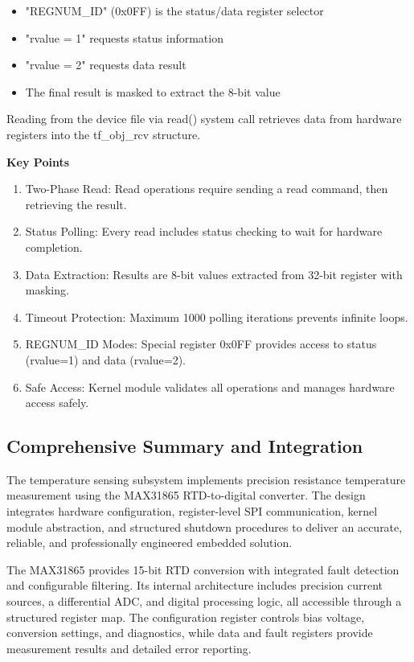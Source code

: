 \begin{itemize}
\item "REGNUM\_ID" (0x0FF) is the status/data register selector
\item "rvalue = 1" requests status information
\item "rvalue = 2" requests data result
\item The final result is masked to extract the 8-bit value
\end{itemize}

Reading from the device file via read() system call retrieves data from hardware registers into the tf\_obj\_rcv structure.

\textbf{Key Points}
\begin{enumerate}
\item Two-Phase Read: Read operations require sending a read command, then retrieving the result.
\item Status Polling: Every read includes status checking to wait for hardware completion.
\item Data Extraction: Results are 8-bit values extracted from 32-bit register with masking.
\item Timeout Protection: Maximum 1000 polling iterations prevents infinite loops.
\item REGNUM\_ID Modes: Special register 0x0FF provides access to status (rvalue=1) and data (rvalue=2).
\item Safe Access: Kernel module validates all operations and manages hardware access safely.
\end{enumerate}

\subsection{Comprehensive Summary and Integration}
The temperature sensing subsystem implements precision resistance temperature measurement using the MAX31865 RTD-to-digital converter. The design integrates hardware configuration, register-level SPI communication, kernel module abstraction, and structured shutdown procedures to deliver an accurate, reliable, and professionally engineered embedded solution.

The MAX31865 provides 15-bit RTD conversion with integrated fault detection and configurable filtering. Its internal architecture includes precision current sources, a differential ADC, and digital processing logic, all accessible through a structured register map. The configuration register controls bias voltage, conversion settings, and diagnostics, while data and fault registers provide measurement results and detailed error reporting.


